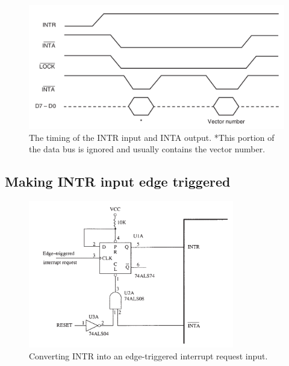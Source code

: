 \begin{figure}[h!]
  \includegraphics[width = 1\textwidth]{./figures/INTR_Timing.png}
  \caption{The timing of the INTR input and INTA output. *This portion of the data bus is ignored and usually contains the vector number.}
\end{figure}
\newpage
\subsection{Making INTR input edge triggered}
\begin{figure}[h!]
  \includegraphics[width = 0.8\textwidth]{./figures/INTR_Edge.png}
  \caption{Converting INTR into an edge-triggered interrupt request input.}
\end{figure}
\newpage

